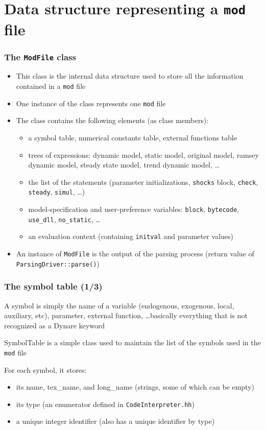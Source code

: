 \documentclass[aspectratio=169]{beamer}
\newenvironment{witemize}{\itemize\addtolength{\itemsep}{8pt}}{\enditemize}
\begin{document}
\section{Data structure representing a \texttt{mod} file}

\begin{frame}
  \frametitle{The \texttt{ModFile} class}
  \begin{itemize}
  \item This class is the internal data structure used to store all the information contained in a \texttt{mod} file
  \item One instance of the class represents one \texttt{mod} file
  \item The class contains the following elements (as class members):
    \begin{itemize}
    \item a symbol table, numerical constants table, external functions table
    \item trees of expressions: dynamic model, static model, original model, ramsey dynamic model, steady state model, trend dynamic model, \ldots
    \item the list of the statements (parameter initializations, \texttt{shocks} block, \texttt{check}, \texttt{steady}, \texttt{simul}, \ldots)
    \item model-specification and user-preference variables: \texttt{block}, \texttt{bytecode}, \texttt{use\_dll}, \texttt{no\_static}, \ldots
    \item an evaluation context (containing \texttt{initval} and parameter values)
    \end{itemize}
  \item An instance of \texttt{ModFile} is the output of the parsing process (return value of \texttt{ParsingDriver::parse()})
  \end{itemize}
\end{frame}

\begin{frame}
  \frametitle{The symbol table (1/3)}
  \begin{witemize}
  \item A \alert{symbol} is simply the name of a variable (endogenous, exogenous, local, auxiliary, etc), parameter, external function, \ldots basically everything that is not recognized as a Dynare keyword
  \item \alert{SymbolTable} is a simple class used to maintain the list of the symbols used in the \texttt{mod} file
  \item For each symbol, it stores:
    \begin{itemize}
    \item its name, tex\_name, and long\_name (strings, some of  which can be empty)
    \item its type (an enumerator defined in \texttt{CodeInterpreter.hh})
    \item a unique integer identifier (also has a unique identifier by type)
    \end{itemize}
  \end{witemize}
\end{frame}
\end{document}
